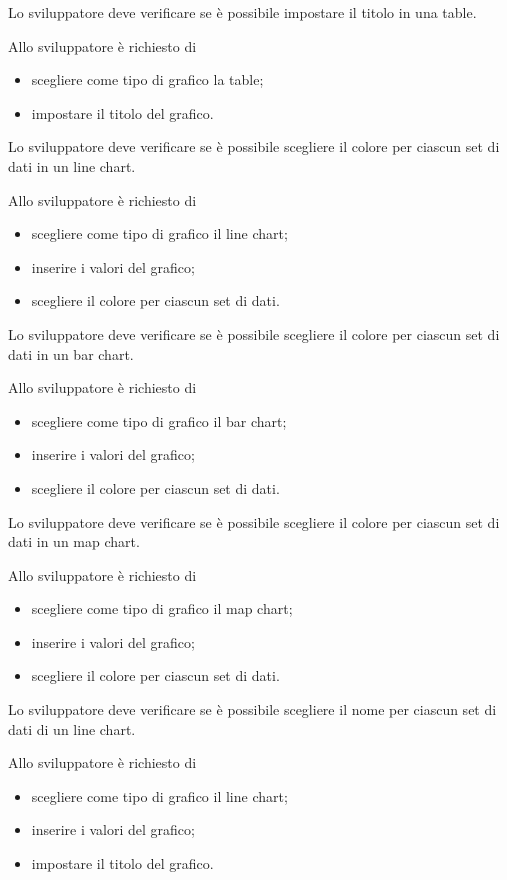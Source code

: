 	Lo sviluppatore deve verificare se è possibile impostare il titolo in una table.

		Allo sviluppatore è richiesto di
		\begin{itemize}
			\item scegliere come tipo di grafico la table;
			\item impostare il titolo del grafico.
		\end{itemize}

	Lo sviluppatore deve verificare se è possibile scegliere il colore per ciascun set di dati in un line chart.

		Allo sviluppatore è richiesto di
		\begin{itemize}
			\item scegliere come tipo di grafico il line chart;
			\item inserire i valori del grafico;
			\item scegliere il colore per ciascun set di dati.
		\end{itemize}

	Lo sviluppatore deve verificare se è possibile scegliere il colore per ciascun set di dati in un bar chart.

		Allo sviluppatore è richiesto di
		\begin{itemize}
			\item scegliere come tipo di grafico il bar chart;
			\item inserire i valori del grafico;
			\item scegliere il colore per ciascun set di dati.
		\end{itemize}

	Lo sviluppatore deve verificare se è possibile scegliere il colore per ciascun set di dati in un map chart.

		Allo sviluppatore è richiesto di
		\begin{itemize}
			\item scegliere come tipo di grafico il map chart;
			\item inserire i valori del grafico;
			\item scegliere il colore per ciascun set di dati.
		\end{itemize}

	Lo sviluppatore deve verificare se è possibile scegliere il nome per ciascun set di dati di un line chart.

		Allo sviluppatore è richiesto di
		\begin{itemize}
			\item scegliere come tipo di grafico il line chart;
			\item inserire i valori del grafico;
			\item impostare il titolo del grafico.
		\end{itemize}


